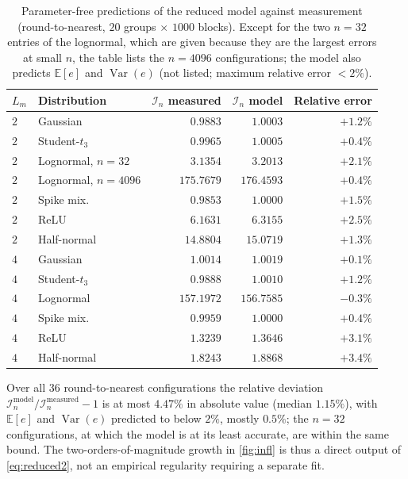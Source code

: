 \documentclass[review,hidelinks,oneeqnum,onetabnum,onefignum,onethmnum]{siamart251216}
\begin{document}
\begin{table}[!tb]
\centering
\caption{Parameter-free predictions of the reduced model against measurement
(round-to-nearest, $20$ groups $\times$ $1000$ blocks). Except for the two
$n=32$ entries of the lognormal, which are given because they are the largest
errors at small $n$, the table lists the $n=4096$ configurations; the model also
predicts $\mathbb{E}[e]$ and $\operatorname{Var}(e)$ (not listed; maximum
relative error $<2\%$).}
\label{tab:model}
\footnotesize
\begin{tabular}{@{}llrrr@{}}
\toprule
$L_m$ & Distribution & $\mathcal I_n$ measured & $\mathcal I_n$ model & Relative error \\
\midrule
$2$ & Gaussian    & $0.9883$ & $1.0003$ & $+1.2\%$ \\
$2$ & Student-$t_3$ & $0.9965$ & $1.0005$ & $+0.4\%$ \\
$2$ & Lognormal, $n=32$ & $3.1354$ & $3.2013$ & $+2.1\%$ \\
$2$ & Lognormal, $n=4096$ & $175.7679$ & $176.4593$ & $+0.4\%$ \\
$2$ & Spike mix.  & $0.9853$ & $1.0000$ & $+1.5\%$ \\
$2$ & ReLU        & $\mathbf{6.1631}$ & $6.3155$ & $+2.5\%$ \\
$2$ & Half-normal & $\mathbf{14.8804}$ & $15.0719$ & $+1.3\%$ \\
\midrule
$4$ & Gaussian    & $1.0014$ & $1.0019$ & $+0.1\%$ \\
$4$ & Student-$t_3$ & $0.9888$ & $1.0010$ & $+1.2\%$ \\
$4$ & Lognormal   & $157.1972$ & $156.7585$ & $-0.3\%$ \\
$4$ & Spike mix.  & $0.9959$ & $1.0000$ & $+0.4\%$ \\
$4$ & ReLU        & $\mathbf{1.3239}$ & $1.3646$ & $+3.1\%$ \\
$4$ & Half-normal & $\mathbf{1.8243}$ & $1.8868$ & $+3.4\%$ \\
\bottomrule
\end{tabular}
\end{table}

\noindent Over all $36$ round-to-nearest configurations the relative deviation
$\mathcal I_n^{\text{model}}/\mathcal I_n^{\text{measured}}-1$ is at most $4.47\%$
in absolute value (median $1.15\%$), with $\mathbb{E}[e]$ and
$\operatorname{Var}(e)$ predicted to below $2\%$, mostly $0.5\%$; the $n=32$
configurations, at which the model is at its least accurate, are within the same
bound. The two-orders-of-magnitude growth in \cref{fig:infl} is thus a direct
output of \cref{eq:reduced2}, not an empirical regularity requiring a separate
fit.
\end{document}
